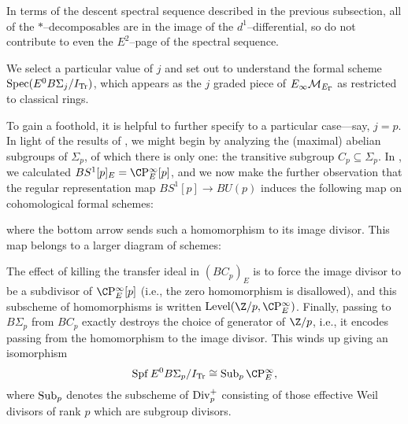 \begin{remark}
In terms of the descent spectral sequence described in the previous subsection, all of the $*$--decomposables are in the image of the $d^1$--differential, so do not contribute to even the $E^2$--page of the spectral sequence.
\end{remark}

We select a particular value of $j$ and set out to understand the formal scheme $\operatorname{Spec} (E^0 B\Sigma_j / I_{\mathrm{Tr}})$, which appears as the $j${\th} graded piece of $E_\infty\mathcal{M}_{E_\Gamma}$ as restricted to classical rings.

\begin{example}
To gain a foothold, it is helpful to further specify to a particular case---say, $j = p$.  In light of the results of , we might begin by analyzing the (maximal) abelian subgroups of $\Sigma_p$, of which there is only one: the transitive subgroup $C_p \subseteq \Sigma_p$.  In , we calculated $BS^1[p]_E = \CP^\infty_E[p]$, and we now make the further observation that the regular representation map $BS^1[p] \to BU(p)$ induces the following map on cohomological formal schemes:
\begin{center}
\end{center}
where the bottom arrow sends such a homomorphism to its image divisor.  This map belongs to a larger diagram of schemes:
\begin{center}
\end{center}
The effect of killing the transfer ideal in $(BC_p)_E$ is to force the image divisor to be a subdivisor of $\CP^\infty_E[p]$ (i.e., the zero homomorphism is disallowed), and this subscheme of homomorphisms is written $\Level(\Z/p, \CP^\infty_E)$.  Finally, passing to $B\Sigma_p$ from $BC_p$ exactly destroys the choice of generator of $\Z/p$, i.e., it encodes passing from the homomorphism to the image divisor.  This winds up giving an isomorphism \[\Spf E^0 B\Sigma_p / I_{\Tr} \cong \Sub_p \CP^\infty_E,\] where $\operatorname{Sub}_p$ denotes the subscheme of $\operatorname{Div}_p^+$ consisting of those effective Weil divisors of rank $p$ which are subgroup divisors.
\end{example}

